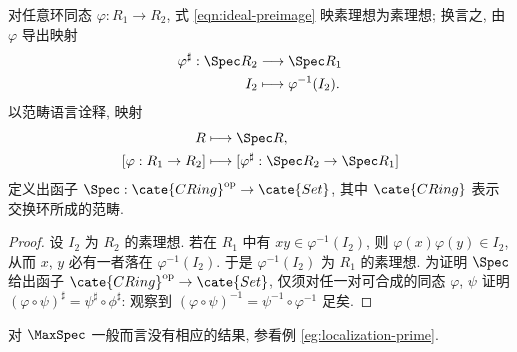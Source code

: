 \begin{lemma}\label{prop:Spec-pullback}
	对任意环同态 $\varphi: R_1 \to R_2$, 式 \eqref{eqn:ideal-preimage} 映素理想为素理想; 换言之, 由 $\varphi$ 导出映射
	\begin{align*}
		\varphi^\sharp: \Spec R_2 & \longrightarrow \Spec R_1 \\
		I_2 & \longmapsto \varphi^{-1}(I_2).
	\end{align*}
	以范畴语言诠释, 映射
	\begin{align*}
		R & \longmapsto \Spec R, \\
		[\varphi: R_1 \to R_2] & \longmapsto [\varphi^\sharp: \Spec R_2 \to \Spec R_1]
	\end{align*}
	定义出函子 $\Spec: \cate{CRing}^\text{op} \to \cate{Set}$, 其中 $\cate{CRing}$ 表示交换环所成的范畴.
\end{lemma}
\begin{proof}
	设 $I_2$ 为 $R_2$ 的素理想. 若在 $R_1$ 中有 $xy \in \varphi^{-1}(I_2)$, 则 $\varphi(x)\varphi(y) \in I_2$, 从而 $x$, $y$ 必有一者落在 $\varphi^{-1}(I_2)$. 于是 $\varphi^{-1}(I_2)$ 为 $R_1$ 的素理想. 为证明 $\Spec$ 给出函子 $\cate{CRing}^\text{op} \to \cate{Set}$, 仅须对任一对可合成的同态 $\varphi$, $\psi$ 证明 $(\varphi \circ \psi)^\sharp = \psi^\sharp \circ \phi^\sharp$: 观察到 $(\varphi \circ \psi)^{-1} = \psi^{-1} \circ \varphi^{-1}$ 足矣.
\end{proof}

\begin{remark}
	对 $\MaxSpec$ 一般而言没有相应的结果, 参看例 \ref{eg:localization-prime}.
\end{remark}


